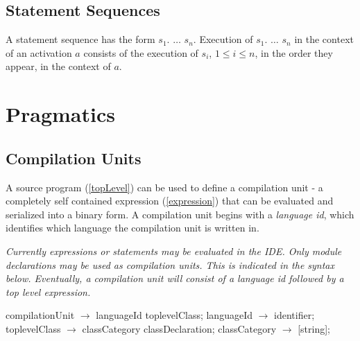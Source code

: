 \documentclass{article}
\begin{document}

\subsection{Statement Sequences}
\label{stmtSeq}

A statement sequence has the form $s_1.$ $\ldots$ $ s_n$. Execution of  $s_1.$ $\ldots$ $ s_n$ in the context of an activation $a$  consists of the execution of $s_i$,  $1 \le i \le n$, in the order they appear,  in the context of $a$. 

\section{Pragmatics}

\subsection{Compilation Units}

A source program  (\ref{topLevel}) can be used to define a compilation unit - a completely self contained expression  (\ref{expression})  that can be evaluated and serialized into a binary form. A compilation unit begins with a {\em language id}, which identifies which language the compilation unit is written in.

{\it
Currently expressions or statements may be evaluated in the IDE. Only module declarations may be used as compilation units. This is indicated in the syntax below. Eventually, a compilation unit will consist of a language id followed by a top level expression.
}

\begin{newspeak}
compilationUnit $\rightarrow$  languageId toplevelClass;
languageId  $\rightarrow$   identifier;
toplevelClass $\rightarrow$ classCategory classDeclaration;
classCategory $\rightarrow$ [string];
\end{newspeak}
\end{document}

